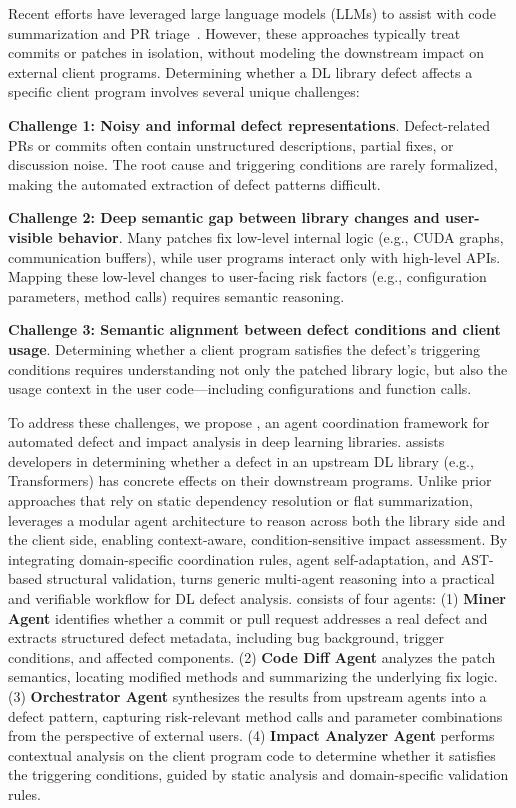 Recent efforts have leveraged large language models (LLMs) to assist with code summarization and PR triage~\cite{liu2019automatic}. 
However, these approaches typically treat commits or patches in isolation, without modeling the downstream impact on external client programs.
Determining whether a DL library defect affects a specific client program involves several unique challenges:

\noindent\textbf{Challenge 1: Noisy and informal defect representations}.
Defect-related PRs or commits often contain unstructured descriptions, partial fixes, or discussion noise. 
The root cause and triggering conditions are rarely formalized, making the automated extraction of defect patterns difficult.

\noindent\textbf{Challenge 2: Deep semantic gap between library changes and user-visible behavior}.
Many patches fix low-level internal logic (e.g., CUDA graphs, communication buffers), while user programs interact only with high-level APIs. 
Mapping these low-level changes to user-facing risk factors (e.g., configuration parameters, method calls) requires semantic reasoning.

\noindent\textbf{Challenge 3: Semantic alignment between defect conditions and client usage}. 
Determining whether a client program satisfies the defect's triggering conditions requires understanding not only the patched library logic, but also the usage context in the user code—including configurations and function calls. 

To address these challenges, we propose \appname, an agent coordination framework for automated defect and impact analysis in deep learning libraries. 
\appname assists developers in determining whether a defect in an upstream DL library (e.g., Transformers) has concrete effects on their downstream programs. 
Unlike prior approaches that rely on static dependency resolution or flat summarization, \appname leverages a modular agent architecture to reason across both the library side and the client side, enabling context-aware, condition-sensitive impact assessment.
By integrating domain-specific coordination rules, agent self-adaptation, and AST-based structural validation, \appname turns generic multi-agent reasoning into a practical and verifiable workflow for DL defect analysis.
\appname consists of four agents: (1) \textbf{Miner Agent} identifies whether a commit or pull request addresses a real defect and extracts structured defect metadata, including bug background, trigger conditions, and affected components.
(2) \textbf{Code Diff Agent} analyzes the patch semantics, locating modified methods and summarizing the underlying fix logic.
(3) \textbf{Orchestrator Agent} synthesizes the results from upstream agents into a defect pattern, capturing risk-relevant method calls and parameter combinations from the perspective of external users.
(4) \textbf{Impact Analyzer Agent} performs contextual analysis on the client program code to determine whether it satisfies the triggering conditions, guided by static analysis and domain-specific validation rules.

